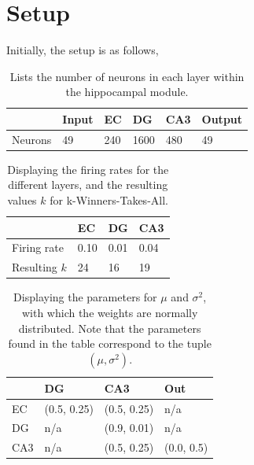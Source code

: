 \section{Setup}

Initially, the setup is as follows,

\begin{table}
\centering
\caption{Lists the number of neurons in each layer within the hippocampal module.}
\label{table:number_of_neurons}
\begin{tabular}{l|l|l|l|l|l|}
\cline{2-6}
                              & Input & EC  & DG   & CA3 & Output \\ \hline
\multicolumn{1}{|l|}{Neurons} & 49    & 240 & 1600 & 480 & 49     \\ \hline
\end{tabular}
\end{table}

\begin{table}
\centering
\caption{Displaying the firing rates for the different layers, and the resulting values $k$ for k-Winners-Takes-All.}
\label{table:firing_rates}
\begin{tabular}{l|l|l|l|}
\cline{2-4}
                                  & EC   & DG   & CA3  \\ \hline
\multicolumn{1}{|l|}{Firing rate} & 0.10 & 0.01 & 0.04 \\ \hline
\multicolumn{1}{|l|}{Resulting $k$} & 24 & 16 & 19 \\ \hline
\end{tabular}
\end{table}

\begin{table}[]
\centering
\caption{Displaying the parameters for $\mu$ and $\sigma^2$, with which the weights are normally distributed. Note that the parameters found in the table correspond to the tuple $(\mu, \sigma^2)$.}
\label{table:initial_weight_distributions}
\begin{tabular}{l|l|l|l|}
\cline{2-4}
                          & DG        & CA3       & Out      \\ \hline
\multicolumn{1}{|l|}{EC}  & (0.5, 0.25) & (0.5, 0.25) & n/a      \\ \hline
\multicolumn{1}{|l|}{DG}  & n/a       & (0.9, 0.01) & n/a      \\ \hline
\multicolumn{1}{|l|}{CA3} & n/a       & (0.5, 0.25) & (0.0, 0.5) \\ \hline
\end{tabular}
\end{table}

